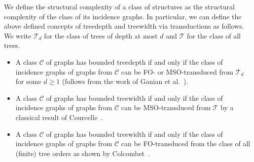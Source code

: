 \documentclass[1p,number,a4paper]{elsarticle}
\theoremstyle{remark}
\newcommand{\Cc}{\mathscr{C}}
\newcommand{\TTT}{\mathscr{T}}
\renewcommand{\FO}{\mathrm{FO}}
\newcommand{\MSO}{\mathrm{MSO}}
\begin{document}


\medskip
We define the structural complexity of a class of structures as the structural complexity of the class of its incidence graphs.
In particular, we can define the above defined concepts of treedepth and treewidth via transductions as follows. We write $\TTT_d$ for the class of trees of depth at most $d$ and $\TTT$ for the class of all trees. 

\begin{itemize}
    \item A class $\Cc$ of graphs has bounded treedepth if and only if the class of incidence graphs of graphs from $\Cc$ can be FO- or MSO-transduced from $\TTT_d$ for some $d\geq 1$ (follows from the work of Ganian et al.~\cite{ganian2019shrub,ganian2012trees}).
    \item A class $\Cc$ of graphs has bounded treewidth if and only if the class of incidence graphs of graphs from $\Cc$ can be MSO-transduced from $\TTT$ by a classical result of Courcelle~\cite{courcelle1992monadic}. 
    \item A class $\Cc$ of graphs has bounded treewidth if and only if the class of incidence graphs of graphs from $\Cc$ can be FO-transduced from the class of all (finite) tree orders as shown by Colcombet~\cite{colcombet2007combinatorial}. 
\end{itemize}
\end{document}

